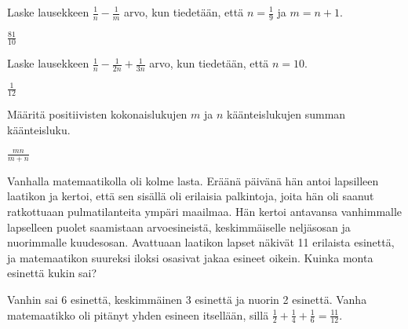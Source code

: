 \begin{tehtavasivu}
\begin{tehtava}
	Laske lausekkeen $\frac{1}{n}-\frac{1}{m}$ arvo, kun tiedetään, että $n = \frac{1}{9}$ ja $m=n+1$.
	\begin{vastaus}
		$\frac{81}{10}$
	\end{vastaus}
\end{tehtava}

\begin{tehtava}
	Laske lausekkeen $\frac{1}{n}-\frac{1}{2n}+\frac{1}{3n}$ arvo, kun tiedetään, että $n = 10$.
	\begin{vastaus}
		$\frac{1}{12}$
	\end{vastaus}
\end{tehtava}
\begin{tehtava}
	Määritä positiivisten kokonaislukujen \(m\) ja \(n\) käänteislukujen summan käänteisluku. 
	\begin{vastaus}
		$\frac{mn}{m+n}$
	\end{vastaus}
\end{tehtava}
\begin{tehtava}
	\begin{alakohdatrivi}
	\end{alakohdatrivi}
	\begin{vastaus}
		\begin{alakohdatrivi}
			\alakohta{$\frac{20}{9}$}
			\alakohta{$\frac{18}{35}$}
			\alakohta{$\frac{1}{2}$}
		\end{alakohdatrivi}
	\end{vastaus}
\end{tehtava}

\begin{tehtava}
	Vanhalla matemaatikolla oli kolme lasta. Eräänä päivänä hän antoi lapsilleen laatikon
	ja kertoi, että sen sisällä oli erilaisia palkintoja, joita hän oli saanut ratkottuaan
	pulmatilanteita ympäri maailmaa. Hän kertoi antavansa vanhimmalle lapselleen puolet 
	saamistaan arvoesineistä, keskimmäiselle neljäsosan ja nuorimmalle kuudesosan. Avattuaan 
	laatikon lapset näkivät 11 erilaista esinettä, ja matemaatikon suureksi iloksi osasivat 
	jakaa esineet oikein. Kuinka monta esinettä kukin sai?
	\begin{vastaus}
		Vanhin sai 6 esinettä, keskimmäinen 3 esinettä ja nuorin 2 esinettä. Vanha
		matemaatikko oli pitänyt yhden esineen itsellään, sillä $\frac{1}{2} + \frac{1}{4}
		+ \frac{1}{6} = \frac{11}{12}$.
	\end{vastaus}
\end{tehtava}


\end{tehtavasivu}
